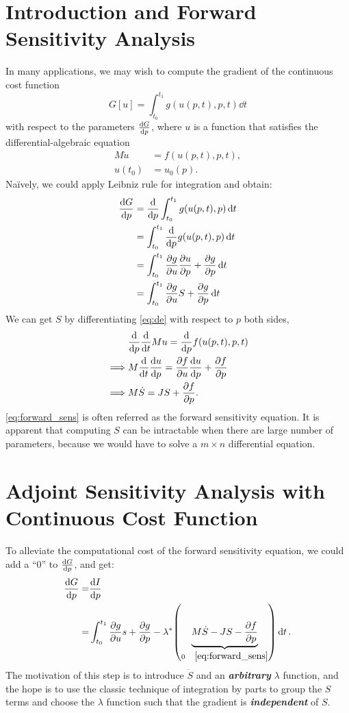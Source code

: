 \documentclass[a4paper,9pt]{article}
\theoremstyle{definition}
\theoremstyle{remark}
\begin{document}
\section{Introduction and Forward Sensitivity Analysis}
In many applications, we may wish to compute the gradient of the continuous cost
function
\begin{equation}
  G[u] = \int_{t_0}^{t_1} g(u(p, t), p, t) \dd{t}
\end{equation}
with respect to the parameters $\dv{G}{p}$, where $u$ is a function that
satisfies the differential-algebraic equation
\begin{align} \label{eq:de}
  M\dot{u} &= f(u(p, t), p, t), \\
  u(t_0) &= u_0(p).
\end{align}
Na\"ively, we could apply Leibniz rule for integration and obtain:
\begin{align}
  \dv{G}{p} &= \dv{p} \int_{t_0}^{t_1} g(u(p, t), p) \dd{t} \\
            &= \int_{t_0}^{t_1} \dv{p} g(u(p, t), p) \dd{t} \\
            &= \int_{t_0}^{t_1} \pdv{g}{u}\pdv{u}{p} + \pdv{g}{p} \dd{t} \\
            &= \int_{t_0}^{t_1} \pdv{g}{u}S + \pdv{g}{p} \dd{t}
            \label{eq:dgdp}
\end{align}
We can get $S$ by differentiating \cref{eq:de} with respect to $p$ both sides,
\begin{align}
  &\dv{p}\dv{t}Mu = \dv{p}f(u(p, t), p, t) \\
  \implies &M\dv{t}\dv{u}{p} = \pdv{f}{u}\dv{u}{p} + \pdv{f}{p} \\
  \implies &M\dot{S} = JS + \pdv{f}{p} \label{eq:forward_sens}.
\end{align}
\cref{eq:forward_sens} is often referred as the forward sensitivity equation.
It is apparent that computing $S$ can be intractable when there are large number
of parameters, because we would have to solve a $m\times n$ differential
equation.

\section{Adjoint Sensitivity Analysis with Continuous Cost Function}
To alleviate the computational cost of the forward sensitivity equation, we
could add a ``$0$'' to $\dv{G}{p}$, and get:
\begin{align}
  \dv{G}{p} = &\dv{I}{p} \\
  = &\int_{t_0}^{t_1} \pdv{g}{u}s + \pdv{g}{p} -
  \lambda^*\qty(\underbrace{M\dot{S} -
  JS - \pdv{f}{p}}_{0 \quad\cref{eq:forward_sens}}) \dd{t}.
\end{align}
The motivation of this step is to introduce $\dot{S}$ and an
\textbf{\emph{arbitrary}} $\lambda$ function, and the hope is to use the classic
technique of integration by parts to group the $S$ terms and choose the
$\lambda$ function such that the gradient is \textbf{\emph{independent}} of
$S$.
\end{document}
